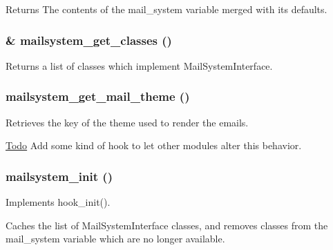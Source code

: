 \begin{DoxyReturn}{Returns}
The contents of the mail\_\-system variable merged with its defaults. 
\end{DoxyReturn}
\hypertarget{mailsystem_8module_aa0df7ed89cbad0a84bc5da2b5d8f551a}{
\subsubsection[{mailsystem\_\-get\_\-classes}]{\setlength{\rightskip}{0pt plus 5cm}\& mailsystem\_\-get\_\-classes ()}}
\label{mailsystem_8module_aa0df7ed89cbad0a84bc5da2b5d8f551a}
Returns a list of classes which implement MailSystemInterface. \hypertarget{mailsystem_8module_af55c024d345c05de91cddc64ca83b7f7}{
\subsubsection[{mailsystem\_\-get\_\-mail\_\-theme}]{\setlength{\rightskip}{0pt plus 5cm}mailsystem\_\-get\_\-mail\_\-theme ()}}
\label{mailsystem_8module_af55c024d345c05de91cddc64ca83b7f7}
Retrieves the key of the theme used to render the emails.

\begin{Desc}
\item[\hyperlink{todo__todo000039}{Todo}]Add some kind of hook to let other modules alter this behavior. \end{Desc}
\hypertarget{mailsystem_8module_afbcc929c2d7814467338374507f0688f}{
\subsubsection[{mailsystem\_\-init}]{\setlength{\rightskip}{0pt plus 5cm}mailsystem\_\-init ()}}
\label{mailsystem_8module_afbcc929c2d7814467338374507f0688f}
Implements hook\_\-init().

Caches the list of MailSystemInterface classes, and removes classes from the mail\_\-system variable which are no longer available.

